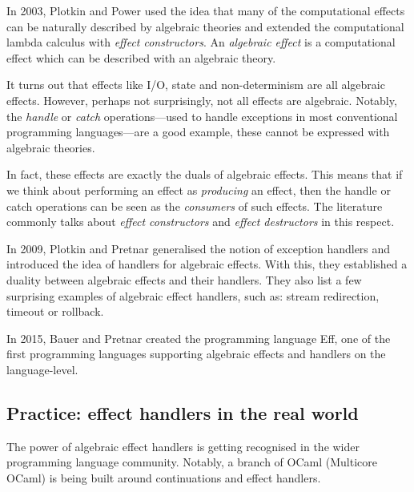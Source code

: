\documentclass[class=article,crop=false,11pt]{standalone}
\begin{document}
In 2003, Plotkin and Power \cite{plotkin2003algebraic} used the idea that many of the computational effects
can be naturally described by algebraic theories and extended the computational lambda calculus with \emph{effect constructors}.
An \emph{algebraic effect} is a computational effect which can be described with an algebraic theory.

It turns out that effects like I/O, state and non-determinism are all algebraic effects. However, perhaps not surprisingly, not all
effects are algebraic. Notably, the \emph{handle} or \emph{catch} operations---used to handle exceptions in
most conventional programming languages---are a good example, these cannot be expressed with algebraic theories.

In fact, these effects are exactly the duals of algebraic effects. This means that
if we think about performing an effect as \emph{producing} an effect, then the handle or
catch operations can be seen as the \emph{consumers} of such effects. The literature commonly talks
about \emph{effect constructors} and \emph{effect destructors} in this respect.


In 2009, Plotkin and Pretnar \cite{plotkin2009handlers} generalised the notion of exception handlers and introduced the idea of handlers for algebraic effects.
With this, they established a duality between algebraic effects and their handlers. 
They also list a few surprising examples of algebraic effect handlers, such as: stream redirection, timeout or rollback.

In 2015, Bauer and Pretnar \cite{bauer2015programming} created the programming language Eff, one of the first programming languages supporting algebraic effects and
handlers on the language-level.

\subsection{Practice: effect handlers in the real world}

The power of algebraic effect handlers is getting recognised in the wider programming language community. 
Notably, a branch of OCaml (Multicore OCaml) is being built around
continuations and effect handlers.
\end{document}
